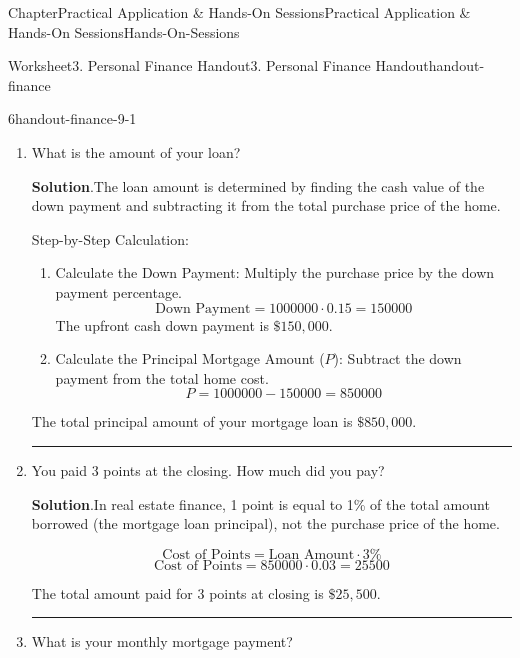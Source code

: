 \documentclass[oneside,10pt,]{book}
\newcommand{\blocktitlefont}{\relax}
\newlength{\workspacestrutwidth}
\begin{document}
\begin{chapterptx}{Chapter}{Practical Application \& Hands-On Sessions}{}{Practical Application \& Hands-On Sessions}{}{}{Hands-On-Sessions}
\begin{worksheet-section}{Worksheet}{3. Personal Finance Handout}{}{3. Personal Finance Handout}{}{}{handout-finance}
\begin{divisionexercise}{6}{}{}{handout-finance-9-1}
\begin{enumerate}[font=\bfseries,label=(\alph*),ref=\alph*]%
\item{}What is the amount of your loan?%
\par\smallskip%
\noindent\textbf{\blocktitlefont Solution}.\hypertarget{handout-finance-9-1-2-2}{}\quad{}The loan amount is determined by finding the cash value of the down payment and subtracting it from the total purchase price of the home.%
\par
Step-by-Step Calculation:%
\begin{enumerate}[label={(\alph*)}]
\item{}Calculate the Down Payment: Multiply the purchase price by the down payment percentage.%
\begin{equation*}
\text{Down Payment} = 1000000 \cdot 0.15 = 150000
\end{equation*}
The upfront cash down payment is \(\$150,000\).%
\item{}Calculate the Principal Mortgage Amount (\(P\)): Subtract the down payment from the total home cost.%
\begin{equation*}
P = 1000000 - 150000 = 850000
\end{equation*}
%
\end{enumerate}
%
\par
The total principal amount of your mortgage loan is \(\$850,000\).%
\par\rule{\workspacestrutwidth}{1in}%
\item{}You paid 3 points at the closing. How much did you pay?%
\par\smallskip%
\noindent\textbf{\blocktitlefont Solution}.\hypertarget{handout-finance-9-1-3-2}{}\quad{}In real estate finance, 1 point is equal to 1\% of the total amount borrowed (the mortgage loan principal), not the purchase price of the home.%
\par
%
\begin{equation*}
\text{Cost of Points} = \text{Loan Amount} \cdot 3\%
\end{equation*}
%
\begin{equation*}
\text{Cost of Points} = 850000 \cdot 0.03 = 25500
\end{equation*}
%
\par
The total amount paid for 3 points at closing is \(\$25,500\).%
\par\rule{\workspacestrutwidth}{1in}%
\item{}What is your monthly mortgage payment?%
\par\smallskip%

\end{enumerate}
\end{divisionexercise}
\end{worksheet-section}
\end{chapterptx}
\end{document}
